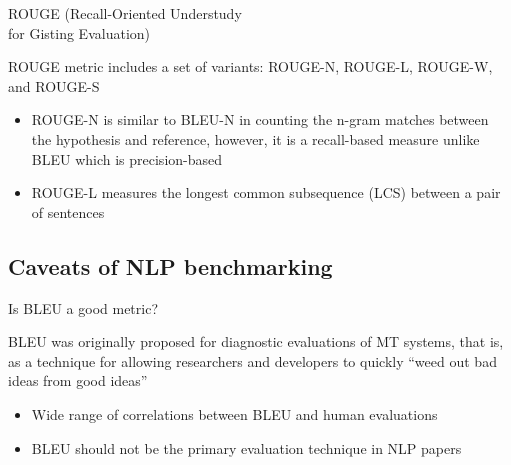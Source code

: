 \documentclass[12pt,aspectratio=169,handout]{beamer}
\begin{document}
\begin{frame}{ROUGE (Recall-Oriented Understudy\\ for Gisting Evaluation)}
	
ROUGE metric includes a set of variants: ROUGE-N, ROUGE-L, ROUGE-W, and ROUGE-S

\begin{itemize}
	\item ROUGE-N is similar to BLEU-N in counting the n-gram matches between the hypothesis and reference, however, it is a recall-based measure unlike BLEU which is precision-based
	\item ROUGE-L measures the longest common subsequence (LCS) between a pair of sentences	
\end{itemize}



\end{frame}



\subsection{Caveats of NLP benchmarking}


\begin{frame}{Is BLEU a good metric?}

BLEU was originally proposed for diagnostic evaluations of MT systems, that is, as a technique for allowing researchers and developers to quickly ``weed out bad ideas from good ideas''

\begin{itemize}
\item Wide range of correlations between BLEU and human evaluations
\item BLEU should not be the primary evaluation technique in NLP papers
\end{itemize}



\end{frame}
\end{document}
